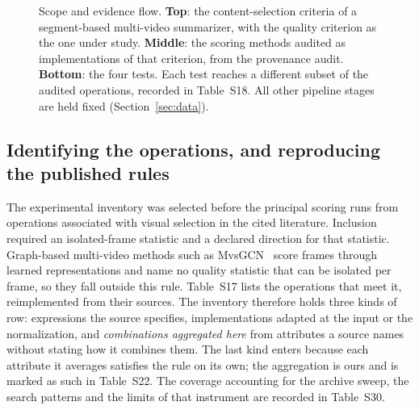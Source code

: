 \begin{figure}[!ht]
{}
\caption{Scope and evidence flow. \textbf{Top}: the content-selection criteria of a
segment-based multi-video summarizer, with the quality criterion as the one under study.
\textbf{Middle}: the scoring methods audited as implementations of that criterion, from the provenance audit. \textbf{Bottom}: the four tests.
Each test reaches a different subset of the audited operations, recorded in Table~S18. All other pipeline stages are held fixed (Section~\ref{sec:data}).}
\label{fig:overview}
\end{figure}

\subsection{Identifying the operations, and reproducing the published rules}\label{sec:prov}

The experimental inventory was selected before the principal scoring runs from operations associated with visual selection in the cited literature. Inclusion required an isolated-frame statistic and a declared direction for that statistic. Graph-based multi-video methods such as MvsGCN~\citep{wu2020mvsgcn} score frames through learned representations and name no quality statistic that can be isolated per frame, so they fall outside this rule. Table~S17 lists the operations that meet it, reimplemented from their sources. The inventory therefore holds three kinds of row: expressions the source specifies, implementations adapted at the input or the normalization, and \emph{combinations aggregated here} from attributes a source names without stating how it combines them. The last kind enters because each attribute it averages satisfies the rule on its own; the aggregation is ours and is marked as such in Table~S22.  The coverage accounting for the archive sweep, the search patterns and the limits of that instrument are recorded in Table~S30.


